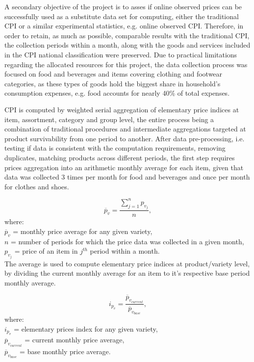 \documentclass[]{article}
\begin{document}
A secondary objective of the project is to asses if online observed prices can be successfully
used as a substitute data set for computing, either the traditional CPI or a similar 
experimental statistics, e.g. online observed CPI. Therefore, in order to retain, 
as much as possible, comparable results with the traditional CPI, the collection periods 
within a month, along with the goods and services included in the CPI national classification 
were preserved. Due to practical limitations regarding the allocated resources for 
this project, the data collection process was focused on food and beverages and items 
covering clothing and footwear categories, as these types of goods hold the biggest share in 
household's consumption expenses, e.g. food accounts for nearly 40\% of total expenses\cite{hhs}. 

CPI is computed by weighted serial aggregation of elementary price indices at item, assortment, 
category and group level, the entire process being a combination of traditional procedures\cite{cpi} 
and intermediate aggregations targeted at product survivability from one period to another. After data pre-processing, 
i.e. testing if data is consistent with the computation requirements, removing duplicates, matching 
products across different periods, the first step requires prices aggregation into an arithmetic 
monthly average for each item, given that data was collected 3 times per month for food and 
beverages and once per month for clothes and shoes. 

\begin{equation}\label{eq:1}
\overline{p}_{v} = \frac{\sum_{j=1}^n {p_{v_{j}}}}{n} ,
\end{equation}
where:\\
$\overline{p}_{v}$ = monthly price average for any given variety, \\
$n$ = number of periods for which the price data was collected in a given month, \\
$p_{v_{j}}$ = price of an item in $j^{th}$ period within a month.\\	


The average is used to compute elementary 
price indices at product/variety level, by dividing the current monthly average for an item to it's respective base period monthly average. 

\begin{equation}\label{eq:2}
i_{p_{v}} = \frac{\overline{p}_{v_{current}}}{\overline{p}_{v_{base}}} ,
\end{equation}
where:\\
$i_{p_{v}}$ = elementary prices index for any given variety, \\
$\overline{p}_{v_{current}}$ = current monthly price average, \\
$\overline{p}_{v_{base}}$ = base monthly price average.\\
\end{document}

